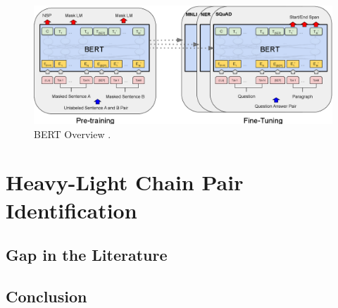 \begin{figure}[h]
 \centering
 \includegraphics[width=15.5cm]{images/bert_architecture.png}
 \caption{BERT Overview \citep{Devlin2019}.}
 \label{phylo_copia}
\end{figure}



\section{Heavy-Light Chain Pair Identification}



\subsection{Gap in the Literature}




\subsection{Conclusion}


